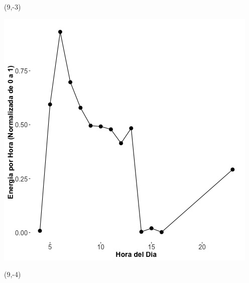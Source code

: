 \documentclass{article}\usepackage[]{graphicx}\usepackage[]{color}
\newenvironment{knitrout}{}{} %
\begin{document}
 \begin{textblock}{1}(9,-3)
\begin{minipage}{20em}
\begingroup

\endgroup
\end{minipage}
\end{textblock}

 \vspace{2cm}

\begin{knitrout}
\color{fgcolor}
\includegraphics[scale=0.75]{figure/A19_fplot_norm_median} 
\end{knitrout}


 \begin{textblock}{1}(9,-4)
\begin{minipage}{20em}
\begingroup

\endgroup
\end{minipage}
\end{textblock}

 \vspace{2cm}
\end{document}
